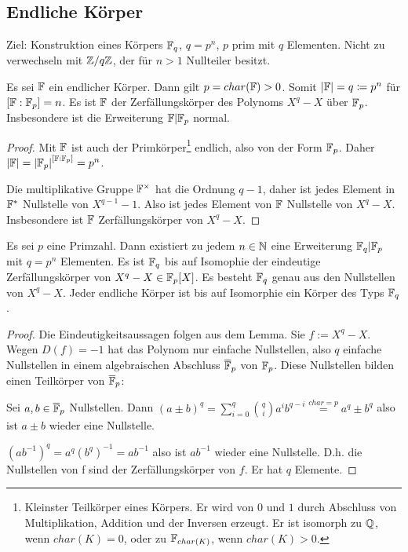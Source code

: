 \documentclass[../main.tex]{subfiles}
\begin{document}
\subsection{Endliche Körper}
Ziel: Konstruktion eines Körpers $\mathbb{F}_q$, $q=p^n$, $p$ prim mit $q$ Elementen. Nicht zu verwechseln mit $\mathbb{Z}/q\mathbb{Z}$, der für $n>1$ Nullteiler besitzt.
\begin{lemma} \label{theo:2.49}
    Es sei $\mathbb{F}$ ein endlicher Körper. Dann gilt $p=char(\mathbb{F})>0$. Somit $\left\vert \mathbb{F} \right\vert = q \coloneqq p^n$ für $[\mathbb{F}:\mathbb{F}_p] = n$. Es ist $\mathbb{F}$ der Zerfällungskörper des Polynoms $X^q-X$ über $\mathbb{F}_p$. Insbesondere ist die Erweiterung $\mathbb{F}|\mathbb{F}_p$ normal.
\end{lemma}
\begin{proof}
    Mit $\mathbb{F}$ ist auch der Primkörper\footnote{Kleinster Teilkörper eines Körpers. Er wird von $0$ und $1$ durch Abschluss von Multiplikation, Addition und der Inversen erzeugt. Er ist isomorph zu $\mathbb{Q}$, wenn $char(K)=0$, oder zu $\mathbb{F}_{char(K)}$, wenn $char(K) > 0$.} endlich, also von der Form $\mathbb{F}_p$. Daher $\left\vert \mathbb{F} \right\vert = \left\vert \mathbb{F}_p \right\vert^{[\mathbb{F}:\mathbb{F}_p]} = p^n$.

    Die multiplikative Gruppe $\mathbb{F}^\times$ hat die Ordnung $q-1$, daher ist jedes Element in $\mathbb{F}^*$ Nullstelle von $X^{q-1}-1$. Also ist jedes Element von $\mathbb{F}$ Nullstelle von $X^q-X$.
    Insbesondere ist $\mathbb{F}$ Zerfällungskörper von $X^q-X$.
\end{proof}

\begin{theorem}
    Es sei $p$ eine Primzahl. Dann existiert zu jedem $n\in \mathbb{N}$ eine Erweiterung $\mathbb{F}_q|\mathbb{F}_p$ mit $q=p^n$ Elementen. Es ist $\mathbb{F}_q$ bis auf Isomophie der eindeutige Zerfällungskörper von $X^q-X\in \mathbb{F}_p[X]$.
    Es besteht $\mathbb{F}_q$ genau aus den Nullstellen von $X^q-X$.
    Jeder endliche Körper ist bis auf Isomorphie ein Körper des Typs $\mathbb{F}_q$.
\end{theorem}
\begin{proof}
    Die Eindeutigkeitsaussagen folgen aus dem Lemma.
    Sie $f:= X^q-X$. Wegen $D(f)=-1$ hat das Polynom nur einfache Nullstellen, also $q$ einfache Nullstellen in einem algebraischen Abschluss $\overline{\mathbb{F}}_p$ von $\mathbb{F}_p$.
    Diese Nullstellen bilden einen Teilkörper von $\overline{\mathbb{F}}_p$:


    Sei $a,b\in \overline{\mathbb{F}}_p$ Nullstellen. Dann $(a\pm b)^q =\sum_{i=0}^q \binom{q}{i}a^ib^{q-i} \overset{char = p}{=} a^q\pm b^q$ also ist $a\pm b$ wieder eine Nullstelle.

    $(ab^{-1})^q = a^q (b^q)^{-1} = ab^{-1}$ also ist $ab^{-1}$ wieder eine Nullstelle.
    D.h. die Nullstellen von f sind der Zerfällungskörper von $f$. Er hat $q$ Elemente.
\end{proof}
\end{document}
